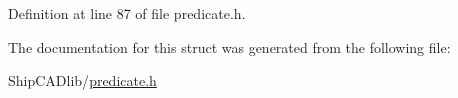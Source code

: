 Definition at line 87 of file predicate.\+h.



The documentation for this struct was generated from the following file\+:\begin{DoxyCompactItemize}
\item 
Ship\+C\+A\+Dlib/\hyperlink{predicate_8h}{predicate.\+h}\end{DoxyCompactItemize}
